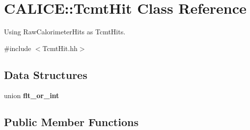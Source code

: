 \section{CALICE::TcmtHit Class Reference}
\label{classCALICE_1_1TcmtHit}


Using RawCalorimeterHits as TcmtHits.  


{\ttfamily \#include $<$TcmtHit.hh$>$}\subsection*{Data Structures}
\begin{DoxyCompactItemize}
\item 
union {\bf flt\_\-or\_\-int}
\end{DoxyCompactItemize}
\subsection*{Public Member Functions}
